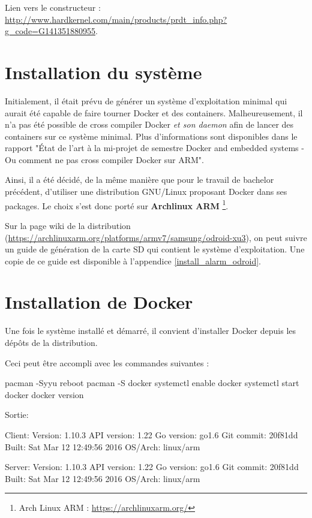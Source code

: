 \documentclass[11pt,a4paper,oneside]{report}
\newcommand{\oldreportname}{État de l’art à la mi-projet de semestre Docker and embedded systems - Ou comment ne pas cross compiler Docker sur ARM}
\begin{document}
Lien vers le constructeur : \url{http://www.hardkernel.com/main/products/prdt_info.php?g_code=G141351880955}.

\section{Installation du système}

Initialement, il était prévu de générer un système d'exploitation minimal qui aurait été capable de faire tourner Docker et des containers. Malheureusement, il n'a pas été possible de cross compiler Docker \textit{et son daemon} afin de lancer des containers sur ce système minimal. Plus d'informations sont disponibles dans le rapport "\oldreportname". 

Ainsi, il a été décidé, de la même manière que pour le travail de bachelor précédent, d'utiliser une distribution GNU/Linux proposant Docker dans ses packages. Le choix s'est donc porté sur \textbf{Archlinux ARM} \footnote{Arch Linux ARM : \url{https://archlinuxarm.org/}}.

Sur la page wiki de la distribution (\url{https://archlinuxarm.org/platforms/armv7/samsung/odroid-xu3}), on peut suivre un guide de génération de la carte SD qui contient le système d'exploitation. Une copie de ce guide est disponible à l'appendice \ref{install_alarm_odroid}.


\section{Installation de Docker}
Une fois le système installé et démarré, il convient d'installer Docker depuis les dépôts de la distribution.

Ceci peut être accompli avec les commandes suivantes :

\begin{bashcode}
pacman -Syyu
reboot
pacman -S docker
systemctl enable docker
systemctl start docker
docker version
\end{bashcode}

Sortie:

\begin{bashcode}
Client:
 Version:      1.10.3
 API version:  1.22
 Go version:   go1.6
 Git commit:   20f81dd
 Built:        Sat Mar 12 12:49:56 2016
 OS/Arch:      linux/arm

Server:
 Version:      1.10.3
 API version:  1.22
 Go version:   go1.6
 Git commit:   20f81dd
 Built:        Sat Mar 12 12:49:56 2016
 OS/Arch:      linux/arm
 \end{bashcode}
\end{document}
